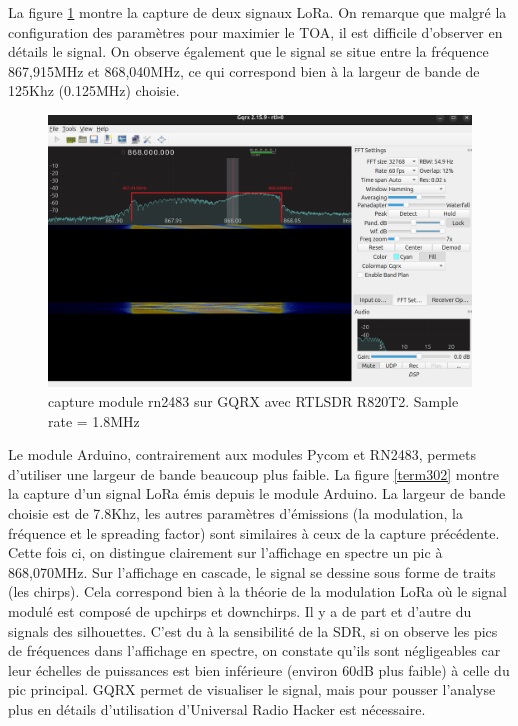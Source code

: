 \vspace{0.1cm}

La figure \ref{term301} montre la capture de deux signaux LoRa. On remarque que malgré la configuration des paramètres pour maximier le TOA, il est difficile d'observer en détails le signal. On observe également que le signal se situe entre la fréquence 867,915MHz et 868,040MHz, ce qui correspond bien à la largeur de bande de 125Khz (0.125MHz) choisie.

\begin{figure}[h]
\centering

\includegraphics[scale=0.28]{images/gqrx4.png}
\caption{capture module rn2483 sur GQRX avec RTLSDR R820T2. Sample rate = 1.8MHz}\label{term301}
\end{figure}

Le module Arduino, contrairement aux modules Pycom et RN2483, permets d'utiliser une largeur de bande beaucoup plus faible. La figure \ref{term302} montre la capture d'un signal LoRa émis depuis le module Arduino. La largeur de bande choisie est de 7.8Khz, les autres paramètres d'émissions (la modulation, la fréquence et le spreading factor) sont similaires à ceux de la capture précédente. Cette fois ci, on distingue clairement sur l'affichage en spectre un pic à 868,070MHz. Sur l'affichage en cascade, le signal se dessine sous forme de traits (les chirps). Cela correspond bien à la théorie de la modulation LoRa où le signal modulé est composé de upchirps et downchirps. Il y a de part et d'autre du signals des silhouettes. C'est du à la sensibilité de la SDR, si on observe les pics de fréquences dans l'affichage en spectre, on constate qu'ils sont négligeables car leur échelles de puissances est bien inférieure (environ 60dB plus faible) à celle du pic principal. GQRX permet de visualiser le signal, mais pour pousser l'analyse plus en détails d'utilisation d'Universal Radio Hacker est nécessaire.

